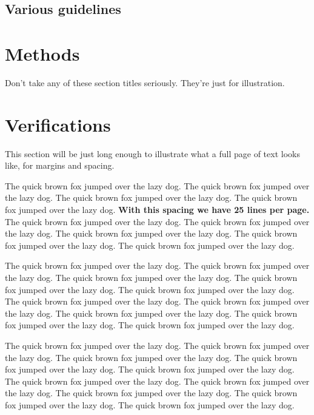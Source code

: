 \documentclass[12pt]{article}
\begin{document}
\hypertarget{various-guidelines}{%
\subsection{Various guidelines}\label{various-guidelines}}

\hypertarget{meth}{%
\section{Methods}\label{meth}}

Don't take any of these section titles seriously. They're just for
illustration.

\hypertarget{verify}{%
\section{Verifications}\label{verify}}

This section will be just long enough to illustrate what a full page of
text looks like, for margins and spacing.

\addtolength{\textheight}{.5in}%

The quick brown fox jumped over the lazy dog. The quick brown fox jumped
over the lazy dog. The quick brown fox jumped over the lazy dog. The
quick brown fox jumped over the lazy dog. \textbf{With this spacing we
have 25 lines per page.} The quick brown fox jumped over the lazy dog.
The quick brown fox jumped over the lazy dog. The quick brown fox jumped
over the lazy dog. The quick brown fox jumped over the lazy dog. The
quick brown fox jumped over the lazy dog.

The quick brown fox jumped over the lazy dog. The quick brown fox jumped
over the lazy dog. The quick brown fox jumped over the lazy dog. The
quick brown fox jumped over the lazy dog. The quick brown fox jumped
over the lazy dog. The quick brown fox jumped over the lazy dog. The
quick brown fox jumped over the lazy dog. The quick brown fox jumped
over the lazy dog. The quick brown fox jumped over the lazy dog. The
quick brown fox jumped over the lazy dog.

The quick brown fox jumped over the lazy dog. The quick brown fox jumped
over the lazy dog. The quick brown fox jumped over the lazy dog. The
quick brown fox jumped over the lazy dog. The quick brown fox jumped
over the lazy dog. The quick brown fox jumped over the lazy dog. The
quick brown fox jumped over the lazy dog. The quick brown fox jumped
over the lazy dog. The quick brown fox jumped over the lazy dog. The
quick brown fox jumped over the lazy dog.
\end{document}

